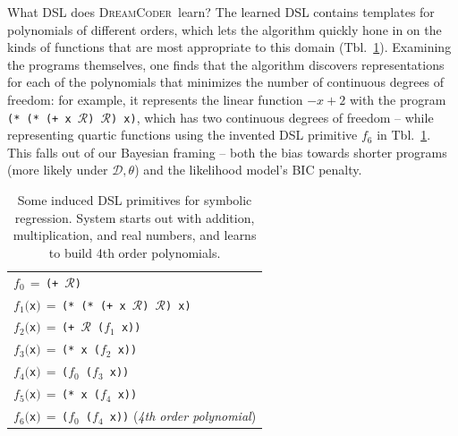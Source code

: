 \documentclass{article}
\newcommand{\system}{\textsc{DreamCoder}~}
\newcommand{\code}[1]{{\footnotesize\texttt{#1}}}
\newcommand{\probability}{\mathds{P}} %
\begin{document}

What DSL does \system learn?
The learned DSL contains templates for polynomials of different orders,
which lets the algorithm quickly hone in on the kinds of functions that are most appropriate to this domain (Tbl.~\ref{regressionDSL}).
Examining the programs themselves,
one finds that the algorithm discovers representations for each of the polynomials that minimizes the number of continuous degrees of freedom:
for example, it represents the linear function $-x+2$ with the program 
\code{(* (* (+ x }$\mathcal{R}$\code{) }$\mathcal{R}$\code{) x)}, which has two continuous degrees of freedom -- while representing quartic functions using the invented DSL primitive $f_6$ in Tbl.~\ref{regressionDSL}.
This falls out of our Bayesian framing -- both the bias towards shorter programs (more likely under $\mathcal{D},\theta$) and the likelihood model's BIC penalty.
\begin{table}\centering
\begin{tabular}{l}
  \toprule
  $f_0\,=\,$\code{(+ $\mathcal{R}$)}\\
  $f_1($\code{x}$)\,=\,$\code{(* (* (+ x $\mathcal{R}$) $\mathcal{R}$) x)} \\
  $f_2($\code{x}$)\,=\,$\code{(+ $\mathcal{R}$ ($f_1$ x))} \\
  $f_3($\code{x}$)\,=\,$\code{(* x ($f_2$ x))}\\
  $f_4($\code{x}$)\,=\,$\code{($f_0$ ($f_3$ x))}\\
  $f_5($\code{x}$)\,=\,$\code{(* x ($f_4$ x))}\\
  $f_6($\code{x}$)\,=\,$\code{($f_0$ ($f_4$ x))} (\emph{4th order polynomial})
  \\\bottomrule
\end{tabular}
\caption{Some induced DSL primitives for symbolic regression. System starts out with addition, multiplication, and real numbers, and learns to build 4th order polynomials.}\label{regressionDSL}
\end{table}
\end{document}
